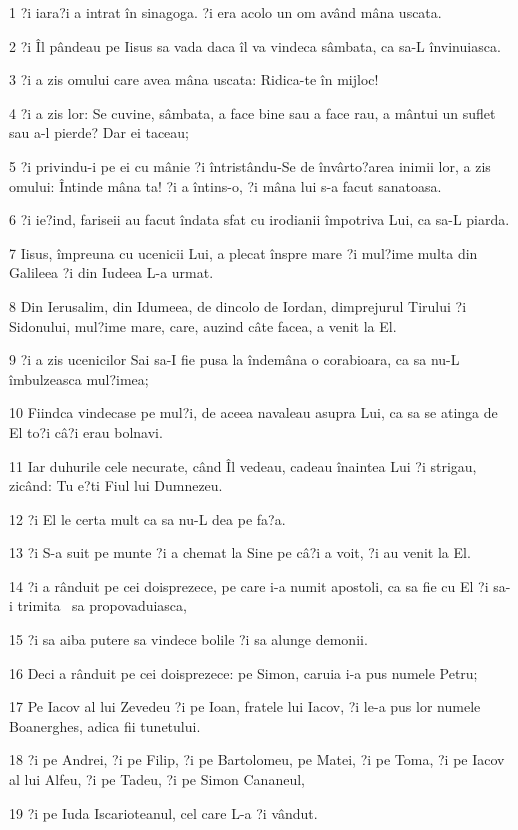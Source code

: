 \par 1 ?i iara?i a intrat în sinagoga. ?i era acolo un om având mâna uscata.
\par 2 ?i Îl pândeau pe Iisus sa vada daca îl va vindeca sâmbata, ca sa-L învinuiasca.
\par 3 ?i a zis omului care avea mâna uscata: Ridica-te în mijloc!
\par 4 ?i a zis lor: Se cuvine, sâmbata, a face bine sau a face rau, a mântui un suflet sau a-l pierde? Dar ei taceau;
\par 5 ?i privindu-i pe ei cu mânie ?i întristându-Se de învârto?area inimii lor, a zis omului: Întinde mâna ta! ?i a întins-o, ?i mâna lui s-a facut sanatoasa.
\par 6 ?i ie?ind, fariseii au facut îndata sfat cu irodianii împotriva Lui, ca sa-L piarda.
\par 7 Iisus, împreuna cu ucenicii Lui, a plecat înspre mare ?i mul?ime multa din Galileea ?i din Iudeea L-a urmat.
\par 8 Din Ierusalim, din Idumeea, de dincolo de Iordan, dimprejurul Tirului ?i Sidonului, mul?ime mare, care, auzind câte facea, a venit la El.
\par 9 ?i a zis ucenicilor Sai sa-I fie pusa la îndemâna o corabioara, ca sa nu-L îmbulzeasca mul?imea;
\par 10 Fiindca vindecase pe mul?i, de aceea navaleau asupra Lui, ca sa se atinga de El to?i câ?i erau bolnavi.
\par 11 Iar duhurile cele necurate, când Îl vedeau, cadeau înaintea Lui ?i strigau, zicând: Tu e?ti Fiul lui Dumnezeu.
\par 12 ?i El le certa mult ca sa nu-L dea pe fa?a.
\par 13 ?i S-a suit pe munte ?i a chemat la Sine pe câ?i a voit, ?i au venit la El.
\par 14 ?i a rânduit pe cei doisprezece, pe care i-a numit apostoli, ca sa fie cu El ?i sa-i trimita  sa propovaduiasca,
\par 15 ?i sa aiba putere sa vindece bolile ?i sa alunge demonii.
\par 16 Deci a rânduit pe cei doisprezece: pe Simon, caruia i-a pus numele Petru;
\par 17 Pe Iacov al lui Zevedeu ?i pe Ioan, fratele lui Iacov, ?i le-a pus lor numele Boanerghes, adica fii tunetului.
\par 18 ?i pe Andrei, ?i pe Filip, ?i pe Bartolomeu, pe Matei, ?i pe Toma, ?i pe Iacov al lui Alfeu, ?i pe Tadeu, ?i pe Simon Cananeul,
\par 19 ?i pe Iuda Iscarioteanul, cel care L-a ?i vândut.
